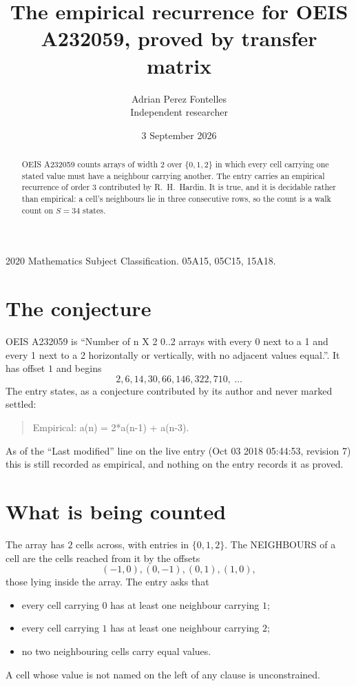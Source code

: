 \documentclass[11pt,a4paper]{article}
\title{The empirical recurrence for OEIS A232059, proved by transfer matrix}
\author{Adrian Perez Fontelles\\ \small Independent researcher}
\date{3 September 2026}
\theoremstyle{plain}
\theoremstyle{definition}
\begin{document}
\maketitle

\begin{abstract}
OEIS A232059 counts arrays of width $2$ over $\{0,1,2\}$ in which every cell carrying one stated
value must have a neighbour carrying another. The entry carries an empirical recurrence of
order $3$ contributed by R.~H.~Hardin. It is true, and it is decidable rather than
empirical: a cell's neighbours lie in three consecutive rows, so the count is a walk count on
$S=34$ states.
\end{abstract}

\noindent\small 2020 Mathematics Subject Classification. 05A15, 05C15, 15A18.\normalsize

\section{The conjecture}

OEIS A232059 is ``Number of n X 2 0..2 arrays with every 0 next to a 1 and every 1 next to a 2 horizontally or vertically, with no adjacent values equal.''. It has offset $1$ and begins
\[
2, 6, 14, 30, 66, 146, 322, 710,\ \dots
\]
The entry states, as a conjecture contributed by its author and never marked settled:
\begin{quote}
Empirical: a(n) = 2*a(n-1) + a(n-3).
\end{quote}
As of the ``Last modified'' line on the live entry (Oct 03 2018 05:44:53, revision 7) this is still
recorded as empirical, and nothing on the entry records it as proved.

\section{What is being counted}

The array has $2$ cells across, with entries in $\{0,1,2\}$. The NEIGHBOURS of a cell are the
cells reached from it by the offsets
\[
(-1,0), (0,-1), (0,1), (1,0),
\]
those lying inside the array. The entry asks that
\begin{itemize}
\item every cell carrying $0$ has at least one neighbour carrying $1$;
\item every cell carrying $1$ has at least one neighbour carrying $2$;
\item no two neighbouring cells carry equal values.
\end{itemize}
A cell whose value is not named on the left of any clause is unconstrained.
\end{document}

